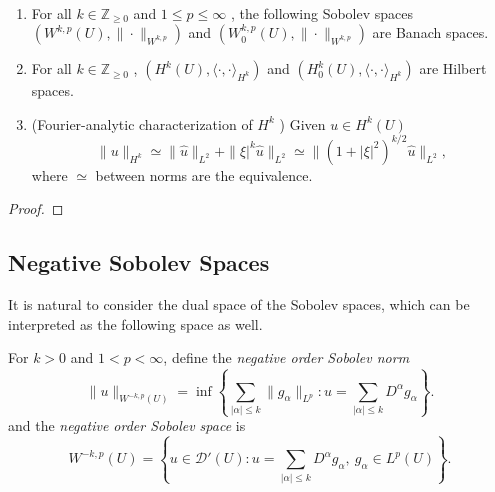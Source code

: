 \begin{proposition}\ \par
\begin{enumerate}
    \item For all \(k \in \mathbb{Z}_{\geq 0}\) and \(1 \leq p \leq \infty\) , the following Sobolev spaces \((W^{k,p}(U), \| \cdot \|_{W^{k,p}})\) and \((W_{0}^{k,p}(U), \| \cdot \|_{W^{k,p}})\) are Banach spaces.
    \item For all \(k \in \mathbb{Z}_{\geq 0}\) , \((H^{k}(U), \langle \cdot , \cdot \rangle_{H^{k}})\) and \((H_{0}^{k}(U), \langle \cdot , \cdot \rangle_{H^{k}})\) are Hilbert spaces.
    \item (Fourier-analytic characterization of \(H^{k}\) ) Given \(u \in H^{k}(U)\)
\[
\| u\|_{H^{k}} \simeq \| \hat{u} \|_{L^{2}} + \| \xi |^{k} \hat{u} \|_{L^{2}} \simeq \| (1 + |\xi |^{2})^{k / 2} \hat{u} \|_{L^{2}},
\]
where $\simeq$ between norms are the equivalence.
\end{enumerate}
\end{proposition}
\begin{proof}
    
\end{proof}

\subsection{Negative Sobolev Spaces}

It is natural to consider the dual space of the Sobolev spaces, which can be interpreted as the following space as well.

\begin{definition}
    For $k>0$ and $1<p<\infty$, define the \emph{negative order Sobolev norm}
\[
\|u\|_{W^{-k,p}(U)}
=
\inf
\left\{
\sum_{|\alpha|\le k}
\|g_\alpha\|_{L^p}
:
u=\sum_{|\alpha|\le k} D^\alpha g_\alpha
\right\}.
\]
and the \emph{negative order Sobolev space} is
\[
W^{-k,p}(U)
=
\left\{
u\in\mathcal{D}'(U):
u=\sum_{|\alpha|\le k} D^\alpha g_\alpha,
\ g_\alpha\in L^p(U)
\right\}.
\]
\end{definition}

